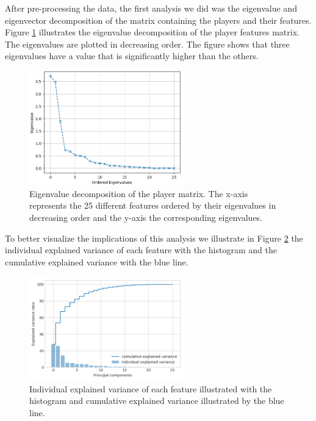 After pre-processing the data, the first analysis we did was the eigenvalue and eigenvector decomposition of the matrix containing the players and their features. Figure \ref{fig:eig} illustrates the eigenvalue decomposition of the player features matrix. The eigenvalues are plotted in decreasing order. The figure shows that three eigenvalues have a value that is significantly higher than the others. 
\begin{figure}[!h]
  \centering
    \includegraphics[width=0.6\textwidth]{masters-thesis-master/masters-thesis/contents/04_results/pre_data_analysis/eig_ord.png}
    \caption{Eigenvalue decomposition of the player matrix. The x-axis represents the 25 different features ordered by their eigenvalues in decreasing order and the y-axis the corresponding eigenvalues.}
    \label{fig:eig}
\end{figure}
To better visualize the implications of this analysis we illustrate in Figure \ref{fig:eig_var} the individual explained variance of each feature with the histogram and the cumulative explained variance with the blue line.
\begin{figure}[!h]
  \centering
    \includegraphics[width=0.6\textwidth]{masters-thesis-master/masters-thesis/contents/04_results/pre_data_analysis/eig_var.png}
    \caption{Individual explained variance of each feature illustrated with the histogram and cumulative explained variance illustrated by the blue line.}
    \label{fig:eig_var}
\end{figure}
